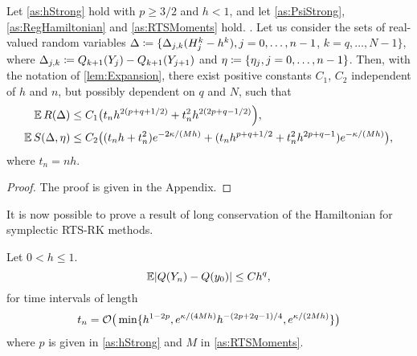 \documentclass[10pt]{article}
\begin{document}
\begin{lemma}\label{lem:Remainder} Let \cref{as:hStrong} hold with $p \geq 3/2$ and $h < 1$, and let \cref{as:PsiStrong}, \cref{as:RegHamiltonian} and \cref{as:RTSMoments} hold. . Let us consider the sets of real-valued random variables $\Delta \coloneqq \{\Delta_{j,k}(H_j^k - h^k), j = 0, \ldots, n-1$, $k = q, \ldots, N-1\}$, where $\Delta_{j,k} \coloneqq  Q_{k+1}(Y_j) - Q_{k+1}(Y_{j+1})$ and $\eta \coloneqq \{\eta_j, j = 0, \ldots, n-1\}$.  Then, with the notation of \cref{lem:Expansion}, there exist positive constants $C_1$, $C_2$ independent of $h$ and $n$, but possibly dependent on $q$ and $N$, such that
	\begin{equation}
	\begin{aligned}
		\operatorname{\mathbb{E}} R(\Delta) &\leq C_1 \big(t_n h^{2(p + q + 1/2)} + t_n^2 h^{2(2p + q - 1/2)}\Big),\\
		\operatorname{\mathbb{E}} S(\Delta, \eta) &\leq C_2 \big( (t_n h + t_n^2) e^{-2\kappa/(Mh)} + (t_n h^{p+q+1/2} + t_n^2 h^{2p+q-1})e^{-\kappa/(Mh)}\big),
	\end{aligned}
	\end{equation}
	where $t_n = nh$.
\end{lemma}
\begin{proof} The proof is given in the Appendix. \end{proof}
It is now possible to prove a result of long conservation of the Hamiltonian for symplectic RTS-RK methods.
\begin{theorem}\label{thm:RTSHamiltonian} Let $0 < h \leq 1$. 
		\begin{equation}
		\operatorname{\mathbb{E}} \lvert Q(Y_n) - Q(y_0)\rvert \leq C h^q,
		\end{equation}
		for time intervals of length 
		\begin{equation}
		t_n = \mathcal{O}\big(\min\{h^{1-2p}, e^{\kappa/(4Mh)} h^{-(2p+2q-1)/4}, e^{\kappa/(2Mh)}\}\big)
		\end{equation}
		where $p$ is given in \cref{as:hStrong} and $M$ in \cref{as:RTSMoments}.
\end{theorem}
\end{document}
